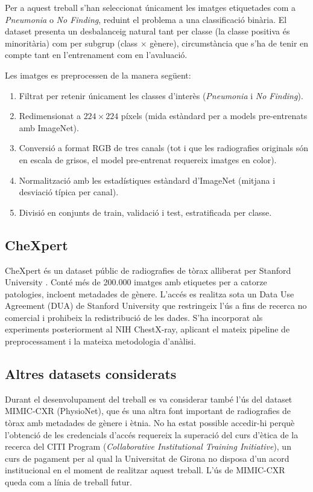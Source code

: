 \documentclass[a4paper,12pt,twoside]{ThesisStyle}
\begin{document}
Per a aquest treball s'han seleccionat únicament les imatges etiquetades com a \textit{Pneumonia} o \textit{No Finding}, reduint el problema a una classificació binària. El dataset presenta un desbalanceig natural tant per classe (la classe positiva és minoritària) com per subgrup (class $\times$ gènere), circumstància que s'ha de tenir en compte tant en l'entrenament com en l'avaluació.

Les imatges es preprocessen de la manera següent:
\begin{enumerate}
    \item Filtrat per retenir únicament les classes d'interès (\textit{Pneumonia} i \textit{No Finding}).
    \item Redimensionat a $224 \times 224$ píxels (mida estàndard per a models pre-entrenats amb ImageNet).
    \item Conversió a format RGB de tres canals (tot i que les radiografies originals són en escala de grisos, el model pre-entrenat requereix imatges en color).
    \item Normalització amb les estadístiques estàndard d'ImageNet (mitjana i desviació típica per canal).
    \item Divisió en conjunts de train, validació i test, estratificada per classe.
\end{enumerate}

\subsection{CheXpert}

CheXpert és un dataset públic de radiografies de tòrax alliberat per Stanford University \cite{Irvin2019}. Conté més de 200.000 imatges amb etiquetes per a catorze patologies, incloent metadades de gènere. L'accés es realitza sota un Data Use Agreement (DUA) de Stanford University que restringeix l'ús a fins de recerca no comercial i prohibeix la redistribució de les dades. S'ha incorporat als experiments posteriorment al NIH ChestX-ray, aplicant el mateix pipeline de preprocessament i la mateixa metodologia d'anàlisi.

\subsection{Altres datasets considerats}

Durant el desenvolupament del treball es va considerar també l'ús del dataset MIMIC-CXR (PhysioNet), que és una altra font important de radiografies de tòrax amb metadades de gènere i ètnia. No ha estat possible accedir-hi perquè l'obtenció de les credencials d'accés requereix la superació del curs d'ètica de la recerca del CITI Program (\textit{Collaborative Institutional Training Initiative}), un curs de pagament per al qual la Universitat de Girona no disposa d'un acord institucional en el moment de realitzar aquest treball. L'ús de MIMIC-CXR queda com a línia de treball futur.
\end{document}
